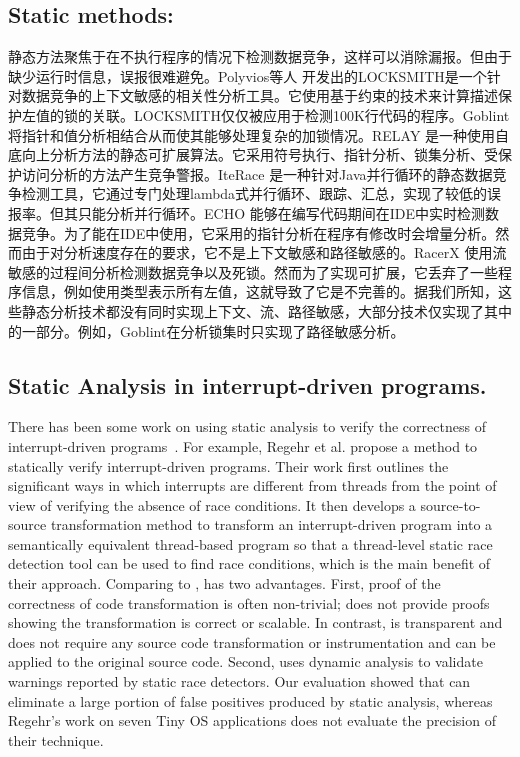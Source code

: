 \subsection{Static methods:} 
静态方法聚焦于在不执行程序的情况下检测数据竞争，这样可以消除漏报\cite{pratikakis2006locksmith, engler2003racerx, radoi2013practical, zhan2016echo, naik2006effective, voung2007relay, vojdani2016static, li2019sword, blackshear2018racerd}。但由于缺少运行时信息，误报很难避免。Polyvios等人 \cite{pratikakis2006locksmith}开发出的LOCKSMITH是一个针对数据竞争的上下文敏感的相关性分析工具。它使用基于约束的技术来计算描述保护左值的锁的关联。LOCKSMITH仅仅被应用于检测100K行代码的程序\cite{voung2007relay}。Goblint\cite{vojdani2016static}将指针和值分析相结合从而使其能够处理复杂的加锁情况。RELAY \cite{naik2006effective} 是一种使用自底向上分析方法的静态可扩展算法。它采用符号执行、指针分析、锁集分析、受保护访问分析的方法产生竞争警报。IteRace \cite{radoi2013practical} 是一种针对Java并行循环的静态数据竞争检测工具，它通过专门处理lambda式并行循环、跟踪、汇总，实现了较低的误报率。但其只能分析并行循环。ECHO \cite{zhan2016echo} 能够在编写代码期间在IDE中实时检测数据竞争。为了能在IDE中使用，它采用的指针分析在程序有修改时会增量分析。然而由于对分析速度存在的要求，它不是上下文敏感和路径敏感的。RacerX \cite{engler2003racerx}使用流敏感的过程间分析检测数据竞争以及死锁。然而为了实现可扩展，它丢弃了一些程序信息，例如使用类型表示所有左值，这就导致了它是不完善的。据我们所知，这些静态分析技术都没有同时实现上下文、流、路径敏感，大部分技术仅实现了其中的一部分。例如，Goblint\cite{vojdani2016static}在分析锁集时只实现了路径敏感分析。

\subsection{Static Analysis in interrupt-driven programs.}
There has been some work on using static analysis to 
verify the correctness of interrupt-driven 
programs~\cite{wei2011static, chen2011static, regehr2007interrupt, fmcad11}.
For example, Regehr et al. \cite{regehr2007interrupt} propose a method to 
statically verify interrupt-driven programs. Their work first 
outlines the significant ways in which interrupts 
are different from threads from the point of view of verifying the absence of race conditions.
It then develops a source-to-source transformation method to
transform an interrupt-driven program into a semantically 
equivalent thread-based program so that a thread-level static race
detection tool can be used to find race conditions, which is
the main benefit of their approach. Comparing to \cite{regehr2007interrupt}, \Name{} has two 
advantages.  First, proof of the correctness of code transformation is often non-trivial; 
\cite{regehr2007interrupt} does not provide  proofs showing the transformation is correct
or scalable. In contrast, \Name{} is transparent and does not require 
any source code transformation or instrumentation and can be applied
to the original source code. Second,  \Name{}  uses dynamic analysis 
to validate warnings reported by static race detectors. 
Our evaluation showed that \Name{} can eliminate a large portion
of false positives produced by static analysis, 
whereas Regehr's work \cite{regehr2007interrupt}  on 
seven Tiny OS applications does not evaluate the precision of
their technique. 

